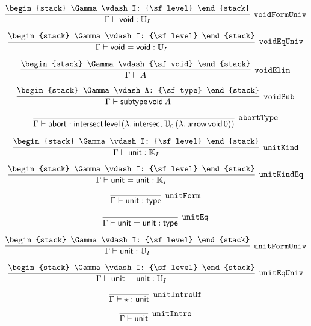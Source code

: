 \[
\infer[{\tt voidFormUniv}]{\Gamma \vdash {\sf void}: {\Bbb U}_{I}}{
\begin{stack}
\Gamma \vdash I: {\sf level}
\end{stack}}
\]

\[
\infer[{\tt voidEqUniv}]{\Gamma \vdash {\sf void}= {\sf void}: {\Bbb U}_{I}}{
\begin{stack}
\Gamma \vdash I: {\sf level}
\end{stack}}
\]

\[
\infer[{\tt voidElim}]{\Gamma \vdash A}{
\begin{stack}
\Gamma \vdash {\sf void}
\end{stack}}
\]

\[
\infer[{\tt voidSub}]{\Gamma \vdash {\sf subtype}\,{\sf void}\,A}{
\begin{stack}
\Gamma \vdash A: {\sf type}
\end{stack}}
\]

\[
\infer[{\tt abortType}]{\Gamma \vdash {\sf abort}: {\sf intersect}\,{\sf level}\,(\lambda .\,{\sf intersect}\,{\Bbb U}_{0}\,(\lambda .\,{\sf arrow}\,{\sf void}\,0))}{}
\]

\[
\infer[{\tt unitKind}]{\Gamma \vdash {\sf unit}: {\Bbb K}_{I}}{
\begin{stack}
\Gamma \vdash I: {\sf level}
\end{stack}}
\]

\[
\infer[{\tt unitKindEq}]{\Gamma \vdash {\sf unit}= {\sf unit}: {\Bbb K}_{I}}{
\begin{stack}
\Gamma \vdash I: {\sf level}
\end{stack}}
\]

\[
\infer[{\tt unitForm}]{\Gamma \vdash {\sf unit}: {\sf type}}{}
\]

\[
\infer[{\tt unitEq}]{\Gamma \vdash {\sf unit}= {\sf unit}: {\sf type}}{}
\]

\[
\infer[{\tt unitFormUniv}]{\Gamma \vdash {\sf unit}: {\Bbb U}_{I}}{
\begin{stack}
\Gamma \vdash I: {\sf level}
\end{stack}}
\]

\[
\infer[{\tt unitEqUniv}]{\Gamma \vdash {\sf unit}= {\sf unit}: {\Bbb U}_{I}}{
\begin{stack}
\Gamma \vdash I: {\sf level}
\end{stack}}
\]

\[
\infer[{\tt unitIntroOf}]{\Gamma \vdash \star : {\sf unit}}{}
\]

\[
\infer[{\tt unitIntro}]{\Gamma \vdash {\sf unit}}{}
\]

